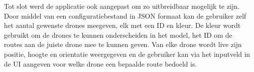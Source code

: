 Tot slot werd de applicatie ook aangepast om zo uitbreidbaar mogelijk te zijn. Door middel van een configuratiebestand in JSON formaat kan de gebruiker zelf het aantal gewenste drones meegeven, elk met een ID en kleur. De kleur wordt gebruikt om de drones te kunnen onderscheiden in het model, het ID om de routes aan de juiste drone mee te kunnen geven. Van elke drone wordt live zijn positie, hoogte en orientatie weergegeven en de gebruiker kan via het inputveld in de UI aangeven voor welke drone een bepaalde route bedoeld is.